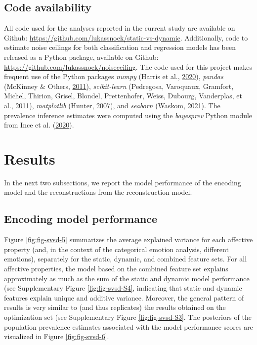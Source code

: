 \documentclass[11pt,american,a4paper,oneside,]{memoir} %
\begin{document}
\hypertarget{svsd-code}{%
\subsection{Code availability}\label{svsd-code}}

All code used for the analyses reported in the current study are available on Github: \url{https://github.com/lukassnoek/static-vs-dynamic}. Additionally, code to estimate noise ceilings for both classification and regression models has been released as a Python package, available on Github: \url{https://github.com/lukassnoek/noiseceiling}. The code used for this project makes frequent use of the Python packages \emph{numpy} (Harris et al., \protect\hyperlink{ref-Harris2020-en}{2020}), \emph{pandas} (McKinney \& Others, \protect\hyperlink{ref-McKinney2011-kl}{2011}), \emph{scikit-learn} (Pedregosa, Varoquaux, Gramfort, Michel, Thirion, Grisel, Blondel, Prettenhofer, Weiss, Dubourg, Vanderplas, et al., \protect\hyperlink{ref-Pedregosa2011-bp}{2011}), \emph{matplotlib} (Hunter, \protect\hyperlink{ref-Hunter2007-at}{2007}), and \emph{seaborn} (Waskom, \protect\hyperlink{ref-waskom2021seaborn}{2021}). The prevalence inference estimates were computed using the \emph{bayesprev} Python module from Ince et al. (\protect\hyperlink{ref-Ince2020-mr}{2020}).

\hypertarget{svsd-results}{%
\section{Results}\label{svsd-results}}

In the next two subsections, we report the model performance of the encoding model and the reconstructions from the reconstruction model.

\hypertarget{encoding-model-performance}{%
\subsection{Encoding model performance}\label{encoding-model-performance}}

Figure \ref{fig:fig-svsd-5} summarizes the average explained variance for each affective property (and, in the context of the categorical emotion analysis, different emotions), separately for the static, dynamic, and combined feature sets. For all affective properties, the model based on the combined feature set explains approximately as much as the sum of the static and dynamic model performance (see Supplementary Figure \ref{fig:fig-svsd-S4}, indicating that static and dynamic features explain unique and additive variance. Moreover, the general pattern of results is very similar to (and thus replicates) the results obtained on the optimization set (see Supplementary Figure \ref{fig:fig-svsd-S3}. The posteriors of the population prevalence estimates associated with the model performance scores are visualized in Figure \ref{fig:fig-svsd-6}.
\end{document}
